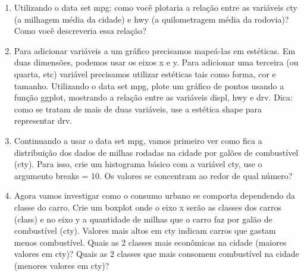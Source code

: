 \documentclass[
]{book}
\begin{document}
\begin{enumerate}
\def\labelenumi{\arabic{enumi}.}
\item
  Utilizando o data set mpg: como você plotaria a relação entre as variáveis cty (a milhagem média da cidade) e hwy (a quilometragem média da rodovia)? Como você descreveria essa relação?
\item
  Para adicionar variáveis a um gráfico precisamos mapeá-las em estéticas. Em duas dimensões, podemos usar os eixos x e y. Para adicionar uma terceira (ou quarta, etc) variável precisamos utilizar estéticas tais como forma, cor e tamanho. Utilizando o data set mpg, plote um gráfico de pontos usando a função ggplot, mostrando a relação entre as variáveis displ, hwy e drv. Dica: como se tratam de mais de duas variáveis, use a estética shape para representar drv.
\item
  Continuando a usar o data set mpg, vamos primeiro ver como fica a distribuição dos dados de milhas rodadas na cidade por galões de combustível (cty). Para isso, crie um histograma básico com a variável cty, use o argumento breaks = 10. Os valores se concentram ao redor de qual número?
\item
  Agora vamos investigar como o consumo urbano se comporta dependendo da classe do
  carro. Crie um boxplot onde o eixo x serão as classes dos carros (class) e no eixo y a quantidade de milhas que o carro faz por galão de combustível (cty). Valores mais altos em cty indicam carros que gastam menos combustível. Quais as 2 classes mais econômicas na cidade (maiores valores em cty)? Quais as 2 classes que mais consomem combustível na cidade (menores valores em cty)?
\end{enumerate}

  
\end{document}

